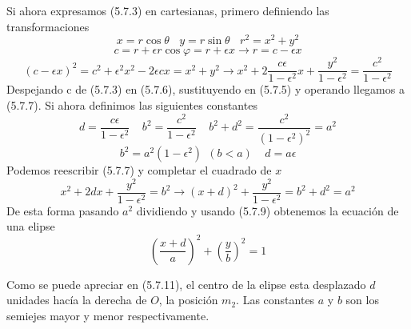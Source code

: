 Si ahora expresamos (5.7.3) en cartesianas, primero definiendo las transformaciones
\begin{equation} \label{5.1.5}
    x = r\cos\theta \ \ \ \ y = r\sin \theta \ \ \ \ r^2=x^2+y^2
\end{equation} 
\vspace{-15pt}
\begin{equation} \label{5.1.6}
    c = r +\epsilon r \cos\varphi = r+\epsilon x \rightarrow r = c-\epsilon x
\end{equation} 
\vspace{-20pt}
\begin{equation} \label{5.1.7}
    (c-\epsilon x)^2 = c^2 + \epsilon^2 x^2 -2\epsilon c x = x^2 + y^2 \rightarrow x^2 +2 \frac{c\epsilon}{1-\epsilon^2}x +\frac{y^2}{1-\epsilon^2}=\frac{c^2}{1-\epsilon^2}
\end{equation} 
Despejando c de (5.7.3) en (5.7.6), sustituyendo en (5.7.5) y operando llegamos a (5.7.7). Si ahora definimos las siguientes constantes
\begin{equation} \label{5.1.8}
    d = \frac{c\epsilon}{1-\epsilon^2} \ \ \ \ \ b^2 = \frac{c^2}{1-\epsilon^2} \ \ \ \ \ b^2 + d^2 = \frac{c^2}{(1-\epsilon^2)^2} = a^2
\end{equation} 
\vspace{-15pt}
\begin{equation} \label{5.1.8}
    b^2 = a^2(1-\epsilon^2) \ \ (b<a) \ \ \ \ \ d=a\epsilon
\end{equation} 
Podemos reescribir (5.7.7) y completar el cuadrado de $x$
\begin{equation} \label{5.1.7}
    x^2 +2dx +\frac{y^2}{1-\epsilon^2}=b^2 \rightarrow (x+d)^2 +\frac{y^2}{1-\epsilon^2}=b^2 + d^2 = a^2
\end{equation} 
De esta forma pasando $a^2$ dividiendo y usando (5.7.9) obtenemos la ecuación de una elipse
\begin{equation} \label{5.1.7}
    \left(\frac{x+d}{a}\right)^2 +\left(\frac{y}{b}\right)^2=1
\end{equation} 
\begin{figure}[H]
    \def\svgwidth{15 cm}
    \normalsize
	
\end{figure}
\vspace{-40pt}
Como se puede apreciar en (5.7.11), el centro de la elipse esta desplazado $d$ unidades hacía la derecha de $O$, la posición $m_2$. Las constantes $a$ y $b$ son los semiejes mayor y menor respectivamente.

